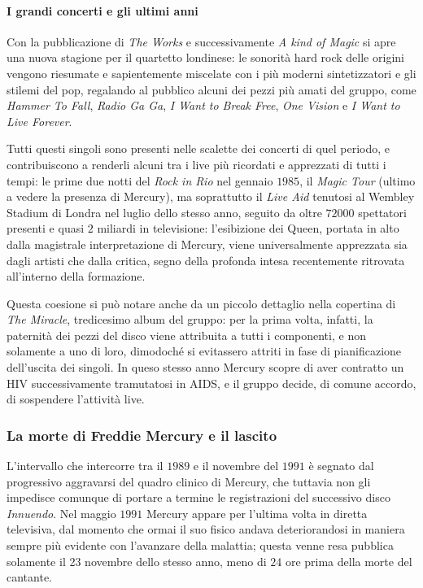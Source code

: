 \documentclass[12pt]{article}
\begin{document}
\paragraph{I grandi concerti e gli ultimi anni}
Con la pubblicazione di \emph{The Works} e successivamente \emph{A kind of Magic} si apre una nuova stagione per il quartetto londinese: le sonorità hard rock delle origini vengono riesumate e sapientemente miscelate con i più moderni sintetizzatori e gli stilemi del pop, regalando al pubblico alcuni dei pezzi più amati del gruppo, come \emph{Hammer To Fall}, \emph{Radio Ga Ga}, \emph{I Want to Break Free}, \emph{One Vision} e \emph{I Want to Live Forever}.

Tutti questi singoli sono presenti nelle scalette dei concerti di quel periodo, e contribuiscono a renderli alcuni tra i live più ricordati e apprezzati di tutti i tempi: le prime due notti del \emph{Rock in Rio} nel gennaio \(1985\), il \emph{Magic Tour} (ultimo a vedere la presenza di Mercury), ma soprattutto il \emph{Live Aid} tenutosi al Wembley Stadium di Londra nel luglio dello stesso anno, seguito da oltre \(72000\) spettatori presenti e quasi \(2\) miliardi in televisione: l'esibizione dei Queen, portata in alto dalla magistrale interpretazione di Mercury, viene universalmente apprezzata sia dagli artisti che dalla critica, segno della profonda intesa recentemente ritrovata all'interno della formazione.

Questa coesione si può notare anche da un piccolo dettaglio nella copertina di \emph{The Miracle}, tredicesimo album del gruppo: per la prima volta, infatti, la paternità dei pezzi del disco viene attribuita a tutti i componenti, e non solamente a uno di loro, dimodoché si evitassero attriti in fase di pianificazione dell'uscita dei singoli. In queso stesso anno Mercury scopre di aver contratto un HIV successivamente tramutatosi in AIDS, e il gruppo decide, di comune accordo, di sospendere l'attività live.

\subsubsection{La morte di Freddie Mercury e il lascito}
L'intervallo che intercorre tra il \(1989\) e il novembre del \(1991\) è segnato dal progressivo aggravarsi del quadro clinico di Mercury, che tuttavia non gli impedisce comunque di portare a termine le registrazioni del successivo disco \emph{Innuendo}. Nel maggio \(1991\) Mercury appare per l'ultima volta in diretta televisiva, dal momento che ormai il suo fisico andava deteriorandosi in maniera sempre più evidente con l'avanzare della malattia; questa venne resa pubblica solamente il 23 novembre dello stesso anno, meno di \(24\) ore prima della morte del cantante.
\end{document}
